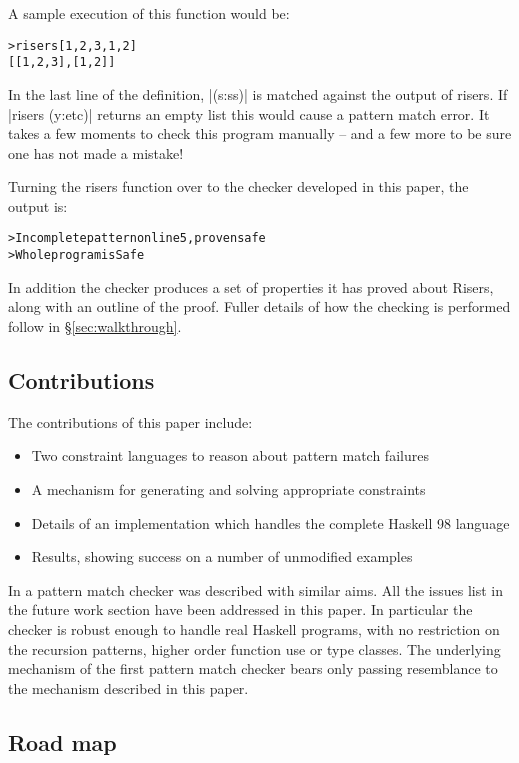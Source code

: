\documentclass[preprint]{sigplanconf}
\newcommand{\C}[1]{\textsf{#1}}
\newenvironment{code}{\begin{alltt}\small}{\end{alltt}}
\begin{document}
A sample execution of this function would be:

\begin{code}
> risers [1,2,3,1,2]
[[1,2,3],[1,2]]
\end{code}

In the last line of the definition, |(s:ss)| is matched against the output of \C{risers}. If |risers (y:etc)| returns an empty list this would cause a pattern match error. It takes a few moments to check this program manually -- and a few more to be sure one has not made a mistake!

Turning the \C{risers} function over to the checker developed in this paper, the output is:

\begin{code}
> Incomplete pattern on line 5, proven safe
> Whole program is Safe
\end{code}

In addition the checker produces a set of properties it has proved about Risers, along with an outline of the proof. Fuller details of how the checking is performed follow in \S\ref{sec:walkthrough}.

\subsection{Contributions}

The contributions of this paper include:

\begin{itemize}
\item Two constraint languages to reason about pattern match failures
\item A mechanism for generating and solving appropriate constraints
\item Details of an implementation which handles the complete Haskell 98 language
\item Results, showing success on a number of unmodified examples
\end{itemize}

In \citet{catch_tfp} a pattern match checker was described with similar aims. All the issues list in the future work section have been addressed in this paper. In particular the checker is robust enough to handle real Haskell programs, with no restriction on the recursion patterns, higher order function use or type classes. The underlying mechanism of the first pattern match checker bears only passing resemblance to the mechanism described in this paper.

\subsection{Road map}
\end{document}
